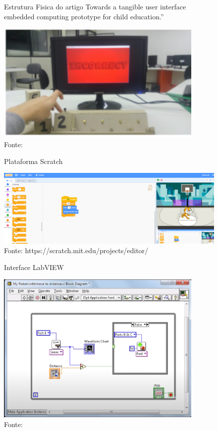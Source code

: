\begin{figure}[h!]
    \centering
    \caption{Estrutura Fisica do artigo Towards a tangible user interface embedded computing prototype for child education.”}
    \includegraphics[width=10cm]{images/cap2/estrutura_artigo_towards.png}
    \caption*{Fonte:}
    \label{figura:estrutura_artigo_towards}
\end{figure}

\begin{figure}[h!]
    \centering
    \caption{Plataforma Scratch}
    \includegraphics[width=15cm]{images/cap2/scratch.png}
    \caption*{Fonte: https://scratch.mit.edu/projects/editor/}
    \label{figura:scratch}
\end{figure}

\begin{figure}[h!]
    \centering
    \caption{Interface LabVIEW}
    \includegraphics[width=10cm]{images/cap2/labview.png}
    \caption*{Fonte:}
    \label{figura:labview}
\end{figure}


